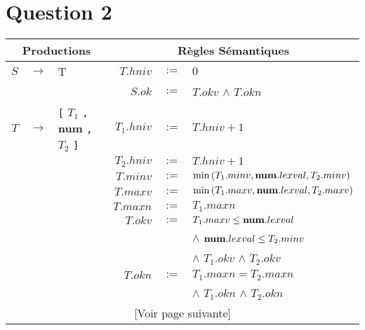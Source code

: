 \documentclass[class=article]{standalone}
\begin{document}
\section*{Question 2}


{
  \hspace{-2cm}
  \begin{tabular}{|rcl|rcl|}
      \hline
      \multicolumn{3}{|c}{\bf Productions} &
      \multicolumn{3}{|c|}{\bf Règles Sémantiques} \\
      \hline
      \hline
      $S$ & $\rightarrow$ & T & $T.hniv$ & $:=$ & $0$ \\
          &               &   & $S.ok$ & $:=$ & $T.okv$ $\wedge$ $T.okn$\\
      \hline
      $T$ & $\rightarrow$ & \lstinline[]$[$ $T_1$ \lstinline[]$,$ {\bf num} \lstinline[]$,$ $T_2$ \lstinline[]$]$ & $T_1.hniv$ & $:=$ & $T.hniv + 1$ \\
          &               &                                                                                       & $T_2.hniv$ & $:=$ & $T.hniv + 1$\\
          &               &                                                                                       & $T.minv$  & $:=$ & $\min\left ( T_1.minv, {\bf num}.lexval, T_2.minv \right )$\\
          &               &                                                                                       & $T.maxv$  & $:=$ & $\min\left ( T_1.maxv, {\bf num}.lexval, T_2.maxv \right )$\\
          &               &                                                                                       & $T.maxn$  & $:=$ & $T_1.maxn$\\
          &               &                                                                                       & $T.okv$   & $:=$ & $T_1.maxv \leq {\bf num}.lexval$\\
          &               &                                                                                       &           &      & $\wedge$ ${\bf num}.lexval \leq T_2.minv$\\
          &               &                                                                                       &           &      & $\wedge$ $T_1.okv$ $\wedge$ $T_2.okv$\\
          &               &                                                                                       & $T.okn$   & $:=$ & $T_1.maxn = T_2.maxn$\\
          &               &                                                                                       &           &      & $\wedge$ $T_1.okn$ $\wedge$ $T_2.okn$\\
      \hline
      \hline
      \multicolumn{6}{|c|}{[Voir page suivante]} \\
      \hline
  \end{tabular}
}
\end{document}
